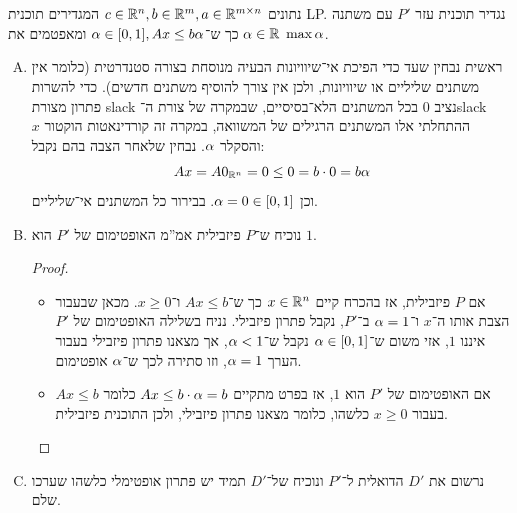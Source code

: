\documentclass[]{../../../../tex/classes/homework}
\begin{document}
	\section{}
	נתונים $c \in \mathbb{R}^{n}, b \in \mathbb{R}^{m}, a \in \mathbb{R}^{m \times n}$ המגדירים תוכנית LP. נגדיר תוכנית עזר $P'$ עם משתנה $\alpha \in \mathbb{R}$ כך ש־$\alpha \in [0, 1], Ax \le b\alpha$ ומאפטמים את $\max \alpha$. 
	\begin{enumerate}[(A)]
		\item ראשית נבחין שעד כדי הפיכת אי־שיוויונות הבעיה מנוסחת בצורה סטנדרטית (כלומר אין משתנים שליליים או שיוויונות, ולכן אין צורך להוסיף משתנים חדשים). כדי להשרות פתרון מצורת slack נציב $0$ בכל המשתנים הלא־בסיסיים, שבמקרה של צורת ה־slack ההתחלתי אלו המשתנים הרגילים של המשוואה, במקרה זה קורדינאטות הוקטור $x$ והסקלר $\alpha$. נבחין שלאחר הצבה בהם נקבל: 
		\[ Ax = A0_{\mathbb{R}^{n}} = 0 \le 0 = b \cdot 0 = b \alpha \]
		וכן $\alpha = 0 \in [0, 1]$. בבירור כל המשתנים אי־שליליים. 
		\item נוכיח ש־$P$ פיזבילית אמ''מ האופטימום של $P'$ הוא $1$. 
		\begin{proof}
			\begin{itemize}
				\item[$\implies$]אם $P$ פיזבילית, אז בהכרח קיים $x \in \mathbb{R}^{n}$ כך ש־$Ax \le b$ ו־$x \ge 0$. מכאן שבעבור הצבת אותו ה־$x$ ו־$\alpha = 1$ ב־$P'$, נקבל פתרון פיזבילי. נניח בשלילה האופטימום של $P'$ איננו $1$, אזי משום ש־$\alpha \in [0, 1]$ נקבל ש־$\alpha < 1$, אך מצאנו פתרון פיזבילי בעבור הערך $\alpha = 1$, וזו סתירה לכך ש־$\alpha$ אופטימום. 
				\item[$\impliedby$]אם האופטימום של $P'$ הוא $1$, אז בפרט מתקיים $Ax \le b \cdot \alpha = b$ כלומר $Ax \le b$ בעבור $x \ge 0$ כלשהו, כלומר מצאנו פתרון פיזבילי, ולכן התוכנית פיזבילית. 
			\end{itemize}\envendproof
		\end{proof}
		\item נרשום את $D'$ הדואלית ל־$P'$ ונוכיח של־$D'$ תמיד יש פתרון אופטימלי כלשהו שערכו שלם. 
		

\end{enumerate}
\end{document}
